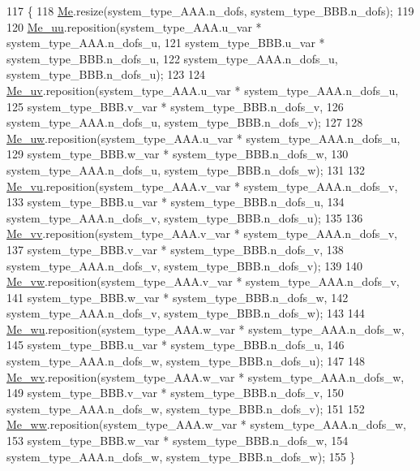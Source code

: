 \begin{DoxyCode}
117     \{
118         \hyperlink{classcarl_1_1coupling__matrices__3_a8168867299d675801de227565e969280}{Me}.resize(system\_type\_AAA.n\_dofs, system\_type\_BBB.n\_dofs);
119 
120         \hyperlink{classcarl_1_1coupling__matrices__3_a9038b3af932d8a3cbca3662c6a071ff6}{Me\_uu}.reposition(system\_type\_AAA.u\_var * system\_type\_AAA.n\_dofs\_u,
121                 system\_type\_BBB.u\_var * system\_type\_BBB.n\_dofs\_u,
122                 system\_type\_AAA.n\_dofs\_u, system\_type\_BBB.n\_dofs\_u);
123 
124         \hyperlink{classcarl_1_1coupling__matrices__3_a4ce35a3abfdcfa68633df7a7f1f685e0}{Me\_uv}.reposition(system\_type\_AAA.u\_var * system\_type\_AAA.n\_dofs\_u,
125                 system\_type\_BBB.v\_var * system\_type\_BBB.n\_dofs\_v,
126                 system\_type\_AAA.n\_dofs\_u, system\_type\_BBB.n\_dofs\_v);
127 
128         \hyperlink{classcarl_1_1coupling__matrices__3_a11eb52d03c2c0520f87c75a89ed4d049}{Me\_uw}.reposition(system\_type\_AAA.u\_var * system\_type\_AAA.n\_dofs\_u,
129                 system\_type\_BBB.w\_var * system\_type\_BBB.n\_dofs\_w,
130                 system\_type\_AAA.n\_dofs\_u, system\_type\_BBB.n\_dofs\_w);
131 
132         \hyperlink{classcarl_1_1coupling__matrices__3_a7f606b964255ab6db7df26647ca7676c}{Me\_vu}.reposition(system\_type\_AAA.v\_var * system\_type\_AAA.n\_dofs\_v,
133                 system\_type\_BBB.u\_var * system\_type\_BBB.n\_dofs\_u,
134                 system\_type\_AAA.n\_dofs\_v, system\_type\_BBB.n\_dofs\_u);
135 
136         \hyperlink{classcarl_1_1coupling__matrices__3_af53f357fe4ae7938cefda80a92900bef}{Me\_vv}.reposition(system\_type\_AAA.v\_var * system\_type\_AAA.n\_dofs\_v,
137                 system\_type\_BBB.v\_var * system\_type\_BBB.n\_dofs\_v,
138                 system\_type\_AAA.n\_dofs\_v, system\_type\_BBB.n\_dofs\_v);
139 
140         \hyperlink{classcarl_1_1coupling__matrices__3_a384c93a0e2bfe69a4b908b333e226113}{Me\_vw}.reposition(system\_type\_AAA.v\_var * system\_type\_AAA.n\_dofs\_v,
141                 system\_type\_BBB.w\_var * system\_type\_BBB.n\_dofs\_w,
142                 system\_type\_AAA.n\_dofs\_v, system\_type\_BBB.n\_dofs\_w);
143 
144         \hyperlink{classcarl_1_1coupling__matrices__3_a3f3132dbd7587e504d12c047c598bc52}{Me\_wu}.reposition(system\_type\_AAA.w\_var * system\_type\_AAA.n\_dofs\_w,
145                 system\_type\_BBB.u\_var * system\_type\_BBB.n\_dofs\_u,
146                 system\_type\_AAA.n\_dofs\_w, system\_type\_BBB.n\_dofs\_u);
147 
148         \hyperlink{classcarl_1_1coupling__matrices__3_a34a3d938e7ad54997b5d8a227614f983}{Me\_wv}.reposition(system\_type\_AAA.w\_var * system\_type\_AAA.n\_dofs\_w,
149                 system\_type\_BBB.v\_var * system\_type\_BBB.n\_dofs\_v,
150                 system\_type\_AAA.n\_dofs\_w, system\_type\_BBB.n\_dofs\_v);
151 
152         \hyperlink{classcarl_1_1coupling__matrices__3_a9b360e5c33276d238262dfe40aaa4aeb}{Me\_ww}.reposition(system\_type\_AAA.w\_var * system\_type\_AAA.n\_dofs\_w,
153                 system\_type\_BBB.w\_var * system\_type\_BBB.n\_dofs\_w,
154                 system\_type\_AAA.n\_dofs\_w, system\_type\_BBB.n\_dofs\_w);
155     \}
\end{DoxyCode}
